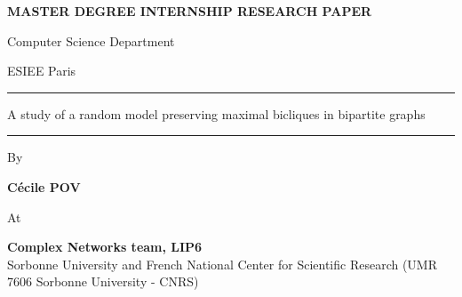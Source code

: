 \documentclass[11pt]{report}
\begin{document}
{\large

\vspace*{1cm}

\begin{center}

{\bf MASTER DEGREE INTERNSHIP RESEARCH PAPER}

\vspace*{0.4cm}

Computer Science Department 

\vspace*{0.1cm}

ESIEE Paris

\vspace*{1cm}

\rule{\linewidth}{0.5pt}
{\Large {\sc A study of a random model preserving maximal bicliques in bipartite graphs}}
\rule{\linewidth}{1pt}

\vspace*{0.5cm}
By\ \\


\vspace*{0.5cm}


{\Large {\bf Cécile POV}}

\vspace*{1cm}


At

\vspace*{0.5cm}

{\Large {\bf Complex Networks team, LIP6} \\
Sorbonne University and French National Center for Scientific Research (UMR 7606 Sorbonne University - CNRS)}




\vspace*{1cm}

\end{center}

%  

\vspace*{1.5cm} 
\\[2ex]
\\[1ex]


}
 
\end{document}
